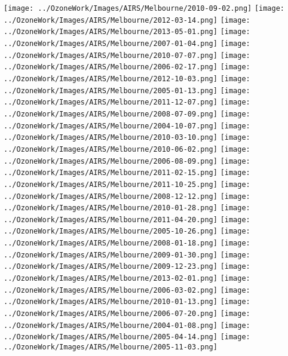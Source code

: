   \texttt{[image: ../OzoneWork/Images/AIRS/Melbourne/2010-09-02.png]}
  \texttt{[image: ../OzoneWork/Images/AIRS/Melbourne/2012-03-14.png]}
  \texttt{[image: ../OzoneWork/Images/AIRS/Melbourne/2013-05-01.png]}
  \texttt{[image: ../OzoneWork/Images/AIRS/Melbourne/2007-01-04.png]}
  \texttt{[image: ../OzoneWork/Images/AIRS/Melbourne/2010-07-07.png]}
  \texttt{[image: ../OzoneWork/Images/AIRS/Melbourne/2006-02-17.png]}
  \texttt{[image: ../OzoneWork/Images/AIRS/Melbourne/2012-10-03.png]}
  \texttt{[image: ../OzoneWork/Images/AIRS/Melbourne/2005-01-13.png]}
  \texttt{[image: ../OzoneWork/Images/AIRS/Melbourne/2011-12-07.png]}
  \texttt{[image: ../OzoneWork/Images/AIRS/Melbourne/2008-07-09.png]}
  \texttt{[image: ../OzoneWork/Images/AIRS/Melbourne/2004-10-07.png]}
  \texttt{[image: ../OzoneWork/Images/AIRS/Melbourne/2010-03-10.png]}
  \texttt{[image: ../OzoneWork/Images/AIRS/Melbourne/2010-06-02.png]}
  \texttt{[image: ../OzoneWork/Images/AIRS/Melbourne/2006-08-09.png]}
  \texttt{[image: ../OzoneWork/Images/AIRS/Melbourne/2011-02-15.png]}
  \texttt{[image: ../OzoneWork/Images/AIRS/Melbourne/2011-10-25.png]}
  \texttt{[image: ../OzoneWork/Images/AIRS/Melbourne/2008-12-12.png]}
  \texttt{[image: ../OzoneWork/Images/AIRS/Melbourne/2010-01-28.png]}
  \texttt{[image: ../OzoneWork/Images/AIRS/Melbourne/2011-04-20.png]}
  \texttt{[image: ../OzoneWork/Images/AIRS/Melbourne/2005-10-26.png]}
  \texttt{[image: ../OzoneWork/Images/AIRS/Melbourne/2008-01-18.png]}
  \texttt{[image: ../OzoneWork/Images/AIRS/Melbourne/2009-01-30.png]}
  \texttt{[image: ../OzoneWork/Images/AIRS/Melbourne/2009-12-23.png]}
  \texttt{[image: ../OzoneWork/Images/AIRS/Melbourne/2013-02-01.png]}
  \texttt{[image: ../OzoneWork/Images/AIRS/Melbourne/2006-03-02.png]}
  \texttt{[image: ../OzoneWork/Images/AIRS/Melbourne/2010-01-13.png]}
  \texttt{[image: ../OzoneWork/Images/AIRS/Melbourne/2006-07-20.png]}
  \texttt{[image: ../OzoneWork/Images/AIRS/Melbourne/2004-01-08.png]}
  \texttt{[image: ../OzoneWork/Images/AIRS/Melbourne/2005-04-14.png]}
  \texttt{[image: ../OzoneWork/Images/AIRS/Melbourne/2005-11-03.png]}
